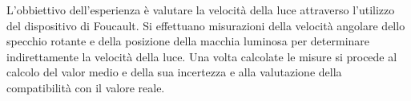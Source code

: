 L'obbiettivo dell'esperienza è valutare la velocità della luce attraverso l'utilizzo del dispositivo di Foucault. Si effettuano misurazioni della velocità angolare dello specchio rotante e della posizione della macchia luminosa per determinare indirettamente la velocità della luce. Una volta calcolate le misure si procede al calcolo del valor medio e della sua incertezza e alla valutazione della compatibilità con il valore reale.

